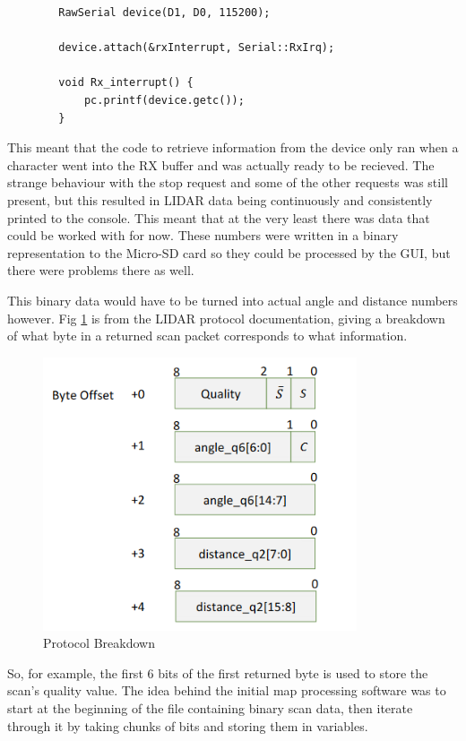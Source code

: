 		\begin{lstlisting}
		RawSerial device(D1, D0, 115200);
		
		device.attach(&rxInterrupt, Serial::RxIrq);
		
		void Rx_interrupt() {
			pc.printf(device.getc());
		}
		\end{lstlisting}
		This meant that the code to retrieve information from the device only ran when a character went into the RX buffer and was actually ready to be recieved. The strange behaviour with the stop request and some of the other requests was still present, but this resulted in LIDAR data being continuously and consistently printed to the console. This meant that at the very least there was data that could be worked with for now. These numbers were written in a binary representation to the Micro-SD card so they could be processed by the GUI, but there were problems there as well.
		
		This binary data would have to be turned into actual angle and distance numbers however. Fig \ref{fig:protocolbreakdown} is from the LIDAR protocol documentation, giving a breakdown of what byte in a returned scan packet corresponds to what information.
		
		\begin{figure}[ht]
			\centering
			\includegraphics[width=.6\linewidth]{SYNTHESIS/protocolbreakdown.png}
			\caption{Protocol Breakdown}
			\label{fig:protocolbreakdown}
		\end{figure}
	
		So, for example, the first 6 bits of the first returned byte is used to store the scan's quality value. The idea behind the initial map processing software was to start at the beginning of the file containing binary scan data, then iterate through it by taking chunks of bits and storing them in variables.
		
